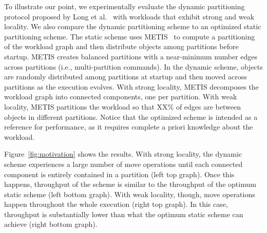 To illustrate our point, we experimentally evaluate the dynamic partitioning protocol proposed by Long et al.~\cite{hoang2016} with workloads that exhibit strong and weak locality.
We also compare the dynamic partitioning scheme to an optimized static partitioning scheme.
The static scheme uses METIS~\cite{Abou-Rjeili:2006} to compute a partitioning of the workload graph and then distribute objects among partitions before startup.
METIS creates balanced partitions with a near-minimum number edges across partitions (i.e., multi-partition commands).
In the dynamic scheme, objects are randomly distributed among partitions at startup and then moved across partitions as the execution evolves.
With strong locality, METIS decomposes the workload graph into connected components, one per partition.
With weak locality, METIS partitions the workload so that XX\% of edges are between objects in different partitions.
Notice that the optimized scheme is intended as a reference for performance, as it requires complete a priori knowledge about the workload.

Figure~\ref{fig:motivation} shows the results.
With strong locality, the dynamic scheme experiences a large number of move operations until each connected component is entirely contained in a partition (left top graph).
Once this happens, throughput of the scheme is similar to the throughput of the optimum static scheme  (left bottom graph).
With weak locality, though, move operations happen throughout the whole execution (right top graph).
In this case, throughput is substantially lower than what the optimum static scheme can achieve (right bottom graph).

